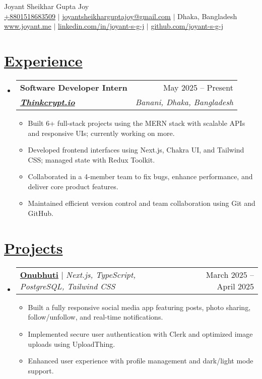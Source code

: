 \documentclass[a4paper,11pt]{article}
\makeatletter
\newcommand{\resumeItem}[1]{
  \item\small{
    {#1 \vspace{-2pt}}
  }
}
\newcommand{\resumeSection}[2]{
  \section{\textbf{\href{#1}{#2}}}
}
\newcommand{\resumeSubheading}[5]{
  \vspace{-2pt}\item
    \begin{tabular*}{0.97\textwidth}[t]{l@{\extracolsep{\fill}}r}
      \textbf{#1} & #2 \\
      \textbf{\textit{\href{#3}{\small #4}}} & \textit{\small #5} \\
    \end{tabular*}\vspace{-7pt}
}
\newcommand{\resumeProjectHeading}[2]{
    \item
    \begin{tabular*}{0.97\textwidth}{l@{\extracolsep{\fill}}r}
      #1 & #2 \\
    \end{tabular*}\vspace{-7pt}
}
\newcommand{\resumeSubHeadingListStart}{\begin{itemize}[leftmargin=0.15in, label={}]}
\newcommand{\resumeSubHeadingListEnd}{\end{itemize}}
\newcommand{\resumeItemListStart}{\begin{itemize}}
\newcommand{\resumeItemListEnd}{\end{itemize}\vspace{-5pt}}
\makeatother
\begin{document}
\begin{center}
    {\Huge \rmfamily Joyant Sheikhar Gupta Joy} \\ \vspace{1pt}
    \small \href{tel:+8801518683509}{\underline{+8801518683509}} $|$ 
    \href{mailto:joyantsheikharguptajoy@gmail.com}{\underline{joyantsheikharguptajoy@gmail.com}} $|$ 
    \small{Dhaka, Bangladesh} \\
    \href{https://joyant.me/}{\underline{www.joyant.me}} $|$
    \href{https://www.linkedin.com/in/joyant-s-g-j/}{\underline{linkedin.com/in/joyant-s-g-j}} $|$
    \href{https://github.com/joyant-s-g-j}{\underline{github.com/joyant-s-g-j}}
\end{center}

\resumeSection{https://joyant.me/experience}{Experience}
  \resumeSubHeadingListStart
    \resumeSubheading
      {Software Developer Intern}{May 2025 -- Present}
      {https://www.thinkcrypt.dev/}{Thinkcrypt.io}{Banani, Dhaka, Bangladesh }
      \resumeItemListStart
        \resumeItem{Built 6+ full-stack projects using the MERN stack with scalable APIs and responsive UIs; currently working on more.}
        \resumeItem{Developed frontend interfaces using Next.js, Chakra UI, and Tailwind CSS; managed state with Redux Toolkit.}
        \resumeItem{Collaborated in a 4-member team to fix bugs, enhance performance, and deliver core product features.}
        \resumeItem{Maintained efficient version control and team collaboration using Git and GitHub.}
      \resumeItemListEnd
  \resumeSubHeadingListEnd

\resumeSection{https://joyant.me/projects}{Projects}
  \resumeSubHeadingListStart
    \resumeProjectHeading
        {\textbf{\href{https://onubhuti.vercel.app/}{Onubhuti}} $|$ \emph{Next.js, TypeScript, PostgreSQL, Tailwind CSS}}{March 2025 -- April 2025}
        \resumeItemListStart
          \resumeItem{Built a fully responsive social media app featuring posts, photo sharing, follow/unfollow, and real-time notifications.}
          \resumeItem{Implemented secure user authentication with Clerk and optimized image uploads using UploadThing.}
          \resumeItem{Enhanced user experience with profile management and dark/light mode support.}
        \resumeItemListEnd
  \resumeSubHeadingListEnd
\end{document}

